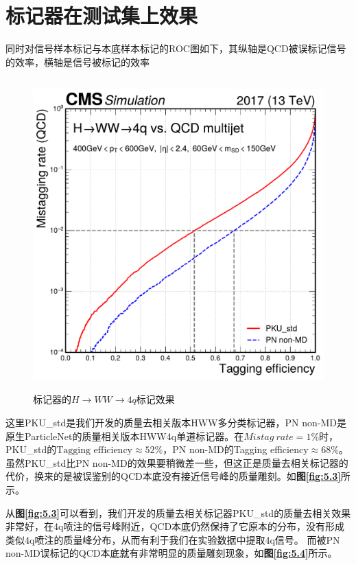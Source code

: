 \section{标记器在测试集上效果}
同时对信号样本标记与本底样本标记的ROC图如下，其纵轴是QCD被误标记信号的效率，横轴是信号被标记的效率
\begin{figure}[H]\label{fig:5.2}
 \centering
 \caption{标记器的$H\to WW\to 4q$标记效果}
 \includegraphics[height=12cm, width=12cm]{pictures/ROC_HWW_4q.pdf}
\end{figure}
这里PKU\_std是我们开发的质量去相关版本HWW多分类标记器，PN non-MD是原生ParticleNet的质量相关版本HWW4q单道标记器。在$Mistag\ rate=1\%$时，PKU\_std的$\text{Tagging efficiency}\approx52\%$，PN non-MD的Tagging efficiency$\approx68\%$。虽然PKU\_std比PN non-MD的效果要稍微差一些，但这正是质量去相关标记器的代价，换来的是被误鉴别的QCD本底没有接近信号峰的质量雕刻。如\textbf{图\ref{fig:5.3}}所示。

从\textbf{图\ref{fig:5.3}}可以看到，我们开发的质量去相关标记器PKU\_std的质量去相关效果非常好，在4q喷注的信号峰附近，QCD本底仍然保持了它原本的分布，没有形成类似4q喷注的质量峰分布，从而有利于我们在实验数据中提取4q信号。
而被PN non-MD误标记的QCD本底就有非常明显的质量雕刻现象，如\textbf{图\ref{fig:5.4}}所示。

